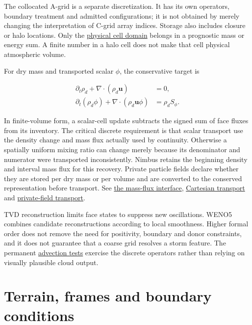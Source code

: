 \documentclass[
  11pt,
]{report}
\begin{document}
The collocated A-grid is a separate discretization. It has its own
operators, boundary treatment and admitted configurations; it is not
obtained by merely changing the interpretation of C-grid array indices.
Storage also includes closure or halo locations. Only the
\href{../include/core/infra/physical_cell_domain.hpp}{physical cell
domain} belongs in a prognostic mass or energy sum. A finite number in a
halo cell does not make that cell physical atmospheric volume.

For dry mass and transported scalar \(\phi\), the conservative target is

\[\begin{aligned}
\partial_t\rho_d+\nabla\!\cdot(\rho_d\boldsymbol u)&=0, \\
\partial_t(\rho_d\phi)+\nabla\!\cdot(\rho_d\boldsymbol u\phi)
&=\rho_d S_\phi.
\end{aligned}\]

In finite-volume form, a scalar-cell update subtracts the signed sum of
face fluxes from its inventory. The critical discrete requirement is
that scalar transport use the density change and mass flux actually used
by continuity. Otherwise a spatially uniform mixing ratio can change
merely because its denominator and numerator were transported
inconsistently. Nimbus retains the beginning density and interval mass
flux for this recovery. Private particle fields declare whether they are
stored per dry mass or per volume and are converted to the conserved
representation before transport. See
\href{../include/numerics/advection/cartesian_mass_flux.hpp}{the
mass-flux interface},
\href{../src/numerics/advection/advection_cartesian.cpp}{Cartesian
transport} and
\href{../include/microphysics/prognostic_transport.hpp}{private-field
transport}.

TVD reconstruction limits face states to suppress new oscillations.
WENO5 combines candidate reconstructions according to local smoothness.
Higher formal order does not remove the need for positivity, boundary
and donor constraints, and it does not guarantee that a coarse grid
resolves a storm feature. The permanent
\href{../tests/numerics/test_advection_cartesian.cpp}{advection tests}
exercise the discrete operators rather than relying on visually
plausible cloud output.

\section{Terrain, frames and boundary
conditions}\label{terrain-frames-and-boundary-conditions}
\end{document}
